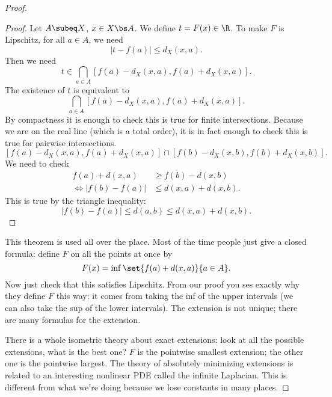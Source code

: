 \begin{proof}
\begin{proof}
Let $A\subeq X$, $x\in X\bs A$. We define $t=F(x)\in \R$. To make $F$ is Lipschitz, for all $a\in A$, we need
\[
|t-f(a)|\le d_X(x,a).
\]
Then we need
\[t\in \bigcap_{a\in A} [f(a)-d_X(x,a),f(a)+d_X(x,a)].\]
The existence of $t$ is equivalent to 
\[
\bigcap_{a\in A}[f(a)-d_X(x,a),f(a)+d_X(x,a)].
\]
By compactness it is enough to check this is true for finite intersections. Because we are on the real line (which is a total order), it is in  fact enough to check this is true for pairwise intersections. 
\[
[f(a)-d_X(x,a), f(a)+d_X(x,a)] \cap [f(b)-d_X(x,b), f(b)+d_X(x,b)].
\]
We need to check 
\begin{align*}
f(a)+d(x,a) &\ge f(b) -d(x,b)\\
\iff 
|f(b)-f(a)|&\le d(x,a)+d(x,b).
\end{align*}
This is true by the triangle inequality: 
\[
|f(b)-f(a)|\le d(a,b) \le  d(x,a)+d(x,b).
\]
\end{proof}
This theorem is used all over the place. Most of the time people just give a closed formula: define $F$ on all the points at once by
\[
F(x)=\inf\set{f(a)+d(x,a)}{a\in A}.
\]
Now just check that this satisfies Lipschitz. From our proof you ses exactly why they define $F$ this way: it comes from taking the inf of the upper intervals (we can also take the sup of the lower intervals). The extension is not unique; there are many formulas for the extension.

There is a whole isometric theory about exact extensions: look at all the possible extensions, what is the best one? $F$ is the pointwise smallest extension; the other one is the pointwise largest. The theory of absolutely minimizing extensions is related to an interesting nonlinear PDE called the infinite Laplacian. This is different from what we're doing because we lose constants in many places.


\end{proof}
